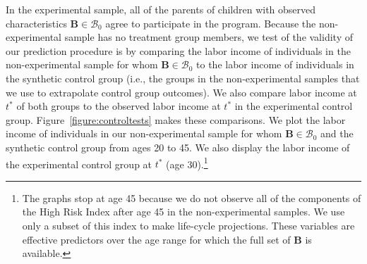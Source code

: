 \noindent In the experimental sample, all of the parents of children with observed characteristics $\bm{B} \in \mathcal{B}_0$ agree to participate in the program. Because the non-experimental sample has no treatment group members, we test of the validity of our prediction procedure is by comparing the labor income of individuals in the non-experimental sample for whom $\bm{B} \in \mathcal{B}_0$ to the labor income of individuals in the synthetic control group (i.e., the groups in the non-experimental samples that we use to extrapolate control group outcomes). We also compare labor income at $t^*$ of both groups to the observed labor income at $t^*$ in the experimental control group. Figure~\ref{figure:controltests} makes these comparisons. We plot the labor income of individuals in our non-experimental sample for whom $\bm{B} \in \mathcal{B}_0$ and the synthetic control group from ages 20 to 45. We also display the labor income of the experimental control group at $t^*$ (age 30).\footnote{The graphs stop at age 45 because we do not observe all of the components of the High Risk Index after age 45 in the non-experimental samples. We use only a subset of this index to make life-cycle projections. These variables are effective predictors over the age range for which the full set of $\bm{B}$ is available.}

